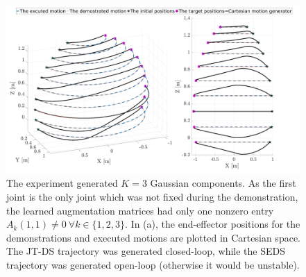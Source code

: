 \documentclass[letterpaper, 10 pt, conference,fleqn]{ieeeconf}
\begin{document}
\begin{figure}[t]
		\includegraphics[width=\linewidth]{Pic/cropped_Sing_1.pdf}
	\caption{The experiment generated $K=3$ Gaussian components. As the first joint is the only joint which was not fixed during the demonstration, the learned augmentation matrices had only one nonzero entry $A_k(1,1)\neq0~\forall k\in \{1, 2, 3\} $.  In (a), the end-effector positions for the demonstrations and executed motions are plotted in Cartesian space. The JT-DS trajectory was generated closed-loop, while the SEDS trajectory was generated open-loop (otherwise it would be unstable).} %
			\label{fig:Sin}
	\vspace{-20pt}
\end{figure}
\end{document}

